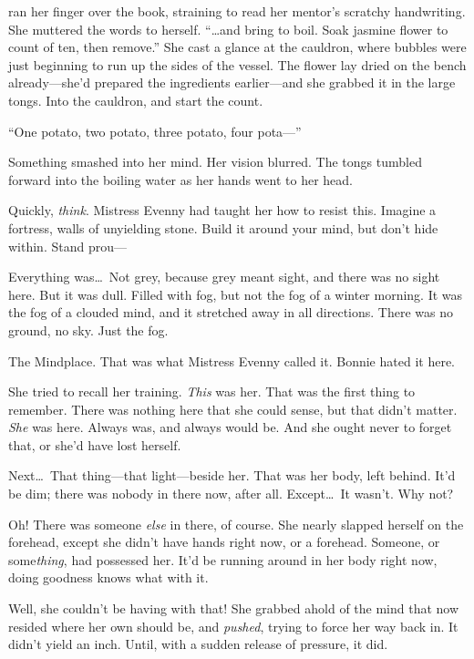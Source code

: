 
 ran her finger over the book, straining to read her mentor's scratchy handwriting.
She muttered the words to herself.
``{\dots}and bring to boil. Soak jasmine flower to count of ten, then remove.''
She cast a glance at the cauldron, where bubbles were just beginning to run up the sides of the vessel.
The flower lay dried on the bench already---she'd prepared the ingredients earlier---and she grabbed it in the large tongs.
Into the cauldron, and start the count.

``One potato, two potato, three potato, four pota---''


Something smashed into her mind.
Her vision blurred.
The tongs tumbled forward into the boiling water as her hands went to her head.

Quickly, \emph{think}.
Mistress Evenny had taught her how to resist this.
Imagine a fortress, walls of unyielding stone.
Build it around your mind, but don't hide within.
Stand prou---


Everything was{\dots}\ Not grey, because grey meant sight, and there was no sight here.
But it was dull.
Filled with fog, but not the fog of a winter morning.
It was the fog of a clouded mind, and it stretched away in all directions.
There was no ground, no sky.
Just the fog.

The Mindplace.
That was what Mistress Evenny called it.
Bonnie hated it here.

She tried to recall her training.
\emph{This} was her.
That was the first thing to remember.
There was nothing here that she could sense, but that didn't matter.
\emph{She} was here.
Always was, and always would be.
And she ought never to forget that, or she'd have lost herself.

Next{\dots}\ That thing---that light---beside her.
That was her body, left behind.
It'd be dim; there was nobody in there now, after all.
Except{\dots}\ It wasn't.
Why not?

Oh!
There was someone \emph{else} in there, of course.
She nearly slapped herself on the forehead, except she didn't have hands right now, or a forehead.
Someone, or some\emph{thing}, had possessed her.
It'd be running around in her body right now, doing goodness knows what with it.

Well, she couldn't be having with that!
She grabbed ahold of the mind that now resided where her own should be, and \emph{pushed}, trying to force her way back in.
It didn't yield an inch.
Until, with a sudden release of pressure, it did.


